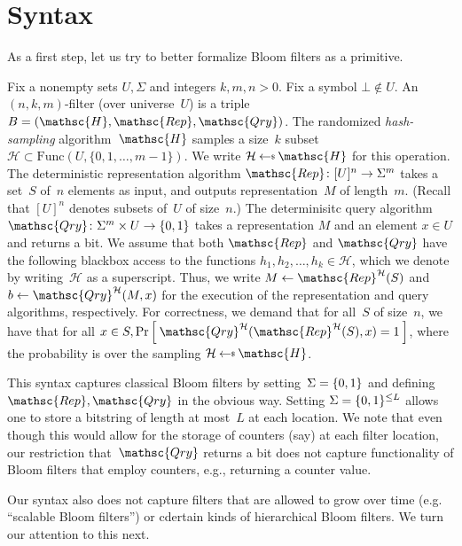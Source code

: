 \section{Syntax}
As a first step, let us try to better formalize Bloom filters as a primitive.

Fix a nonempty sets $U,\Sigma$ and integers $k,m,n>0$.  Fix a symbol $\bot \not\in U$.  An $(n,k,m)$-filter (over universe~$U$) is a triple  $B=(\mathsc{H},\mathsc{Rep},\mathsc{Qry})$.   
%
The randomized \emph{hash-sampling} algorithm~$\mathsc{H}$ samples a size~$k$ subset~$\mathcal{H} \subset \mathrm{Func}(U,\{0,1,\ldots,m-1\})$.  We write $\mathcal{H} \getsr \mathsc{H}$ for this operation.
%
The deterministic representation algorithm $\mathsc{Rep}\colon [U]^n \rightarrow \Sigma^m$ takes a set~$S$ of~$n$ elements as input, and outputs representation~$M$ of length~$m$.  (Recall that $[U]^n$ denotes subsets of~$U$ of size~$n$.)
%
The determinisitc query algorithm $\mathsc{Qry}\colon \Sigma^m \times U \rightarrow \bits$ takes a representation $M$ and an element $x \in U$ and returns a bit.  
%
We assume that both $\mathsc{Rep}$ and $\mathsc{Qry}$ have the following blackbox access to the functions $h_1,h_2,\ldots,h_k \in \mathcal{H}$, which we denote by writing~$\mathcal{H}$ as a superscript.   Thus, we write $M \gets \mathsc{Rep}^{\mathcal{H}}(S)$ and $b \gets \mathsc{Qry}^{\mathcal{H}}(M,x)$ for the execution of the representation and query algorithms, respectively.
%
For correctness, we demand that for all~$S$ of size~$n$, we have that for all $x \in S, \Prob{\mathsc{Qry}^{\mathcal{H}}(\mathsc{Rep}^{\mathcal{H}}(S),x)=1}$, where the probability is over the sampling $\mathcal{H}\getsr\mathsc{H}$.  

This syntax captures classical Bloom filters by setting~$\Sigma=\{0,1\}$ and defining $\mathsc{Rep},\mathsc{Qry}$ in the obvious way.  Setting $\Sigma=\{0,1\}^{\leq L}$ allows one to store a bitstring of length at most~$L$ at each location.   We note that even though this would allow for the storage of counters (say) at each filter location, our restriction that~$\mathsc{Qry}$ returns a bit does not capture functionality of Bloom filters that employ counters, e.g., returning a counter value.

Our syntax also does not capture filters that are allowed to grow over time (e.g. ``scalable Bloom filters'') or cdertain kinds of hierarchical Bloom filters.  We turn our attention to this next.

